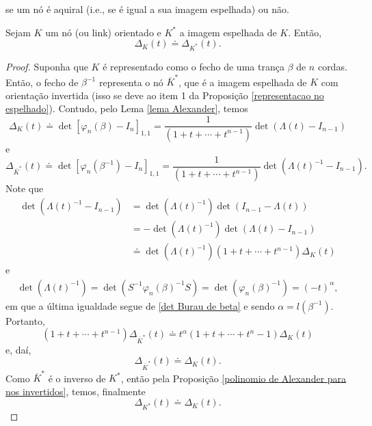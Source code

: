 	se um nó é aquiral (i.e., se é igual a sua imagem espelhada) ou não. 
	\begin{prop}
	\label{polinomio de Alexander para nos espelhados}
		Sejam $K$ um nó (ou link) orientado e $K^\ast$ a imagem espelhada de $K$. Então,
		\begin{equation*}
		    \Delta_K(t)\doteq\Delta_{K^\ast}(t).
		\end{equation*} 
	\end{prop}
	\begin{proof}
		Suponha que $K$ é representado como o fecho de uma trança $\beta$ de $n$ cordas. 
		Então, o fecho de $\beta^{-1}$ representa o nó $\overline{K}^{\ast}$, que é a 
		imagem espelhada de $K$ com orientação invertida (isso se deve ao item 1 da 
		Proposição \ref{representacao no espelhado}). Contudo, pelo Lema \ref{lema Alexander}, temos
		\begin{equation*}
		    \Delta_K(t) \doteq \det[\varphi_n(\beta) - I_n]_{1,1} 
		    = \frac{1}{(1+t+\cdots+t^{n-1})}\det(\Lambda(t) - I_{n-1})
		\end{equation*}
		e
		\begin{equation*}
		    \Delta_{\overline{K}^{\ast}}(t) \doteq \det[\varphi_n(\beta^{-1}) - I_n]_{1,1} 
		    = \frac{1}{(1+t+\cdots+t^{n-1})}\det(\Lambda(t)^{-1} - I_{n-1}).
		\end{equation*}
		Note que
		\begin{align*}
		    \det(\Lambda(t)^{-1} - I_{n-1}) &= \det(\Lambda(t)^{-1})\det(I_{n-1} - \Lambda(t)) \\
		    &= -\det(\Lambda(t)^{-1})\det(\Lambda(t) - I_{n-1}) \\
		    &\doteq \det(\Lambda(t)^{-1})(1+t+\cdots+t^{n-1})\Delta_K(t) 
		\end{align*}
		e
		\begin{align*}
		    \det(\Lambda(t)^{-1}) 
		    = \det( S^{-1}\varphi_n(\beta)^{-1}S ) 
		    = \det(\varphi_n(\beta)^{-1}) = (-t)^{\alpha},
		\end{align*}
		em que a última igualdade segue de \eqref{det Burau de beta} e sendo $\alpha = l(\beta^{-1})$. 
		Portanto, 
		\begin{equation*}
		    (1+t+\cdots+t^{n-1})\Delta_{\overline{K}^{\ast}}(t)\doteq t^{\alpha}(1+t+\cdots+t^n-1)\Delta_K(t)
		\end{equation*}
		e, daí,
		\begin{equation*}
		    \Delta_{\overline{K}^{\ast}}(t) \doteq \Delta_K(t).
		\end{equation*}
		Como $\overline{K}^{\ast}$ é o inverso de $K^\ast$, então pela 
		Proposição \ref{polinomio de Alexander para nos invertidos}, temos, finalmente
		\begin{equation*}
		    \Delta_{K^\ast}(t) \doteq \Delta_K(t).
		\end{equation*}
	\end{proof}
